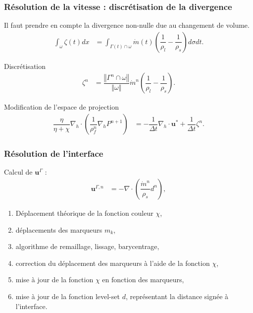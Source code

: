 \documentclass{beamer}
\newcommand{\inte}{\Gamma}
\newcommand{\vect}[1]{\bm{#1}}
\newcommand{\npl}{{n+1}}
\newcommand{\normeVec}[1]{\left\Vert #1\right\Vert}
\renewcommand{\frac}{\dfrac}
\begin{document}
\begin{frame}
    \frametitle{Résolution de la vitesse : discrétisation de la divergence}
    \footnotesize
    \footnotesize
        Il faut prendre en compte la divergence non-nulle due au changement de volume.\\
\begin{align}
	 \int_\omega \zeta (t) dx &= \int_{\inte (t) \cap \omega} \Dot{m}(t) \left( \frac{1}{\rho_l} - \frac{1}{\rho_s} \right) d\sigma dt.
\end{align}

\begin{ceablock}{Discrétisation}
\begin{align}
	\zeta^n &= \frac{\normeVec{\inte^n \cap \omega}}{\normeVec{\omega}}\Dot{m}^n \left( \frac{1}{\rho_l} - \frac{1}{\rho_s} \right).
\end{align}
\end{ceablock}
\begin{ceablock}{Modification de l'espace de projection}
\begin{align}
	\label{eq:pression3}
	\frac{\eta}{\eta + \chi} \nabla_h \cdot \left( \frac{1}{\rho^n_f} \nabla_h P^\npl \right) &= -\frac{1}{\Delta t} \nabla_h \cdot \vect{u}^* + \frac{1}{\Delta t} \zeta^n.
\end{align}
\end{ceablock}


\begin{center}
		\begin{tikzpicture}[scale = 0.5, every node/.style={scale=0.5}]
			
		\end{tikzpicture}
\end{center}
\end{frame}

\begin{frame}
    \frametitle{Résolution de l'interface}
    \footnotesize
Calcul de $\vect{u}^\inte$ :
\begin{align}
	\label{eq:interfaceVitesse}
	\vect{u}^{\inte,n} &=  - \nabla \cdot \left( \frac{\Dot{m}^n}{\rho_s}d^n \right),
\end{align}
\begin{enumerate}
	\item Déplacement théorique de la fonction couleur $\chi$,
	\item déplacements des marqueurs $m_k$,
	\item algorithme de remaillage, lissage, barycentrage,
	\item correction du déplacement des marqueurs à l'aide de la fonction $\chi$,
	\item mise à jour de la fonction $\chi$ en fonction des marqueurs,
	\item mise à jour de la fonction level-set $d$, représentant la distance signée à l'interface.

\end{enumerate}
\end{frame}
\end{document}
